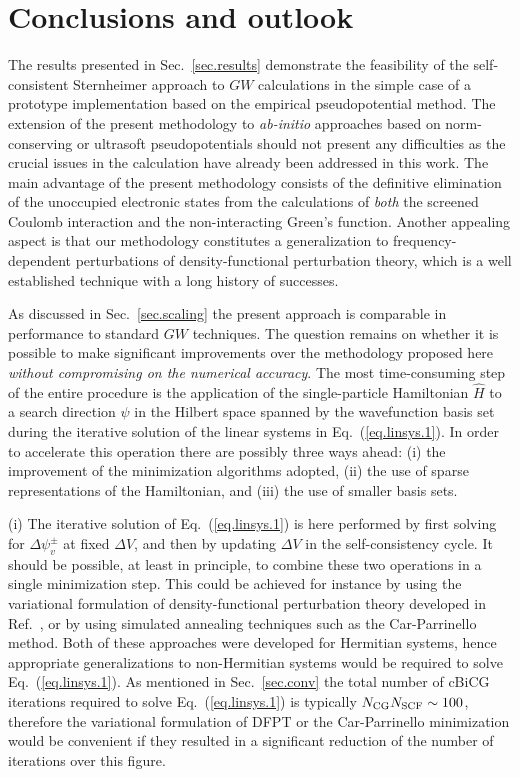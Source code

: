 \documentclass[twocolumn,prb,showpacs,superscriptaddress]{revtex4}
\def\H{\hat{H}}
\begin{document}
\section{Conclusions and outlook}\label{sec.conclusions}

The results presented in Sec.\ \ref{sec.results} demonstrate the feasibility
of the self-consistent Sternheimer approach to $GW$ calculations in the simple case of a prototype implementation
based on the empirical pseudopotential method. The extension of the present
methodology to {\it ab-initio} approaches based on norm-conserving\cite{ncpp}
or ultrasoft\cite{uspp} pseudopotentials should not present any difficulties
as the crucial issues in the calculation have already been addressed 
in this work. 
The main advantage of the present methodology consists of the definitive
elimination of the unoccupied electronic states from the calculations of
{\it both} the screened Coulomb interaction and the non-interacting Green's
function. Another appealing aspect is that our methodology constitutes a
generalization to frequency-dependent perturbations of 
density-functional perturbation theory,\cite{baroni.rmp} which is a well
established technique with a long history of successes.

As discussed in Sec.\ \ref{sec.scaling} the present approach is comparable
in performance to standard\cite{hl86} $GW$ techniques.
The question remains on whether it is possible to make significant
improvements over the methodology proposed here {\it without compromising on
the numerical accuracy}. The most time-consuming
step of the entire procedure is the application of the single-particle
Hamiltonian $\H$ to a search direction $\psi$ in the Hilbert space spanned
by the wavefunction basis set during the iterative solution 
of the linear systems in Eq.\ (\ref{eq.linsys.1}). In order to accelerate
this operation there are possibly three ways ahead: (i) the improvement of the
minimization algorithms adopted, (ii) the use of sparse representations of
the Hamiltonian, and (iii) the use of smaller basis sets. 

(i) The iterative solution of Eq.\ (\ref{eq.linsys.1}) is here performed
by first solving for $\Delta\psi_v^\pm$ at fixed $\Delta V$, and then 
by updating $\Delta V$ in the self-consistency cycle.
It should be possible, at least in principle, to combine these two
operations in a single minimization step. This could be achieved
for instance by using the variational formulation of density-functional
perturbation theory developed in Ref.\ ,
or by using simulated annealing techniques such as the Car-Parrinello 
method.\cite{carparrinello} Both of these approaches were developed
for Hermitian systems, hence appropriate generalizations
to non-Hermitian systems would be required to solve Eq.\ (\ref{eq.linsys.1}).
As mentioned in Sec.\ \ref{sec.conv} the total number of cBiCG iterations
required to solve Eq.\ (\ref{eq.linsys.1}) is typically 
$N_{\rm CG} N_{\rm SCF}\sim 100$, therefore the variational formulation
of DFPT or the Car-Parrinello minimization would be convenient
if they resulted in a significant reduction of the number of iterations
over this figure.
\end{document}
